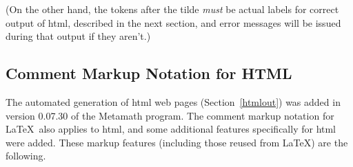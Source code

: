 (On the other hand, the tokens after the tilde {\em must} be actual
labels for correct output of {\sc html}, described in the next section,
and error messages will be issued during that output if they aren't.)

\subsection{Comment Markup Notation for HTML}\label{htmlmkup}

The automated generation of {\sc html} web pages
(Section~\ref{htmlout}) was added in version 0.07.30 of the Metamath program.
The comment markup notation for \LaTeX\ also applies to {\sc html}, and
some additional features specifically for {\sc html} were added.
These markup features (including those reused from \LaTeX) are the
following.
